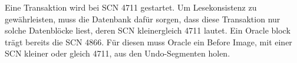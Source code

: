 
            Eine Transaktion wird bei SCN 4711 gestartet. Um Lesekonsistenz zu gewährleisten, muss die Datenbank dafür sorgen, dass diese Transaktion nur solche Datenblöcke liest, deren SCN kleinergleich 4711 lautet. Ein Oracle block trägt bereits die SCN 4866. Für diesen muss Oracle ein Before Image, mit einer SCN kleiner oder gleich 4711, aus den Undo-Segmenten holen.
